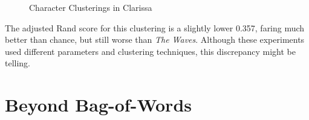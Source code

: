 \documentclass[12pt]{article}
\begin{document}
\begin{figure}
\centering   
{}
\caption{Character Clusterings in Clarissa}
\end{figure}

The adjusted Rand score for this clustering is a slightly lower 0.357,
faring much better than chance, but still worse than \emph{The Waves}.
Although these experiments used different parameters and clustering
techniques, this discrepancy might be telling.

\section{Beyond Bag-of-Words}\label{beyond-bag-of-words}
\end{document}
